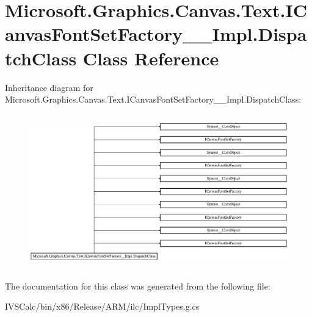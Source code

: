 \hypertarget{class_microsoft_1_1_graphics_1_1_canvas_1_1_text_1_1_i_canvas_font_set_factory_____impl_1_1_dispatch_class}{}\section{Microsoft.\+Graphics.\+Canvas.\+Text.\+I\+Canvas\+Font\+Set\+Factory\+\_\+\+\_\+\+Impl.\+Dispatch\+Class Class Reference}
\label{class_microsoft_1_1_graphics_1_1_canvas_1_1_text_1_1_i_canvas_font_set_factory_____impl_1_1_dispatch_class}
Inheritance diagram for Microsoft.\+Graphics.\+Canvas.\+Text.\+I\+Canvas\+Font\+Set\+Factory\+\_\+\+\_\+\+Impl.\+Dispatch\+Class\+:\begin{figure}[H]
\begin{center}
\leavevmode
\includegraphics[height=6.710239cm]{class_microsoft_1_1_graphics_1_1_canvas_1_1_text_1_1_i_canvas_font_set_factory_____impl_1_1_dispatch_class}
\end{center}
\end{figure}


The documentation for this class was generated from the following file\+:\begin{DoxyCompactItemize}
\item 
I\+V\+S\+Calc/bin/x86/\+Release/\+A\+R\+M/ilc/Impl\+Types.\+g.\+cs\end{DoxyCompactItemize}
